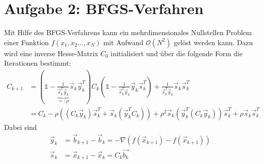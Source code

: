 \section*{Aufgabe 2: BFGS-Verfahren}

Mit Hilfe des BFGS-Verfahrens kann ein mehrdimensionales Nullstellen Problem einer Funktion $f(x_1,x_2...,x_N)$ mit Aufwand $\mathcal{O}(N^2)$ gelöst werden kann.
Dazu wird eine inverse Hesse-Matrix $C_0$ initialisiert und über die folgende Form die Iterationen bestimmt:
\begin{align*}
C_{k+1} &= (\mathds{1} - \underbrace{\frac{1}{\vec{s}_k^T\vec{y}_k}}_{=:\rho}\vec{s}_k\vec{y}_k^T)C_k(\mathds{1}-\frac{1}{\vec{s}_k^T\vec{y}_k}\vec{y}_k\vec{s}_k^T) +\frac{1}{\vec{s}_k^T\vec{y}_k}\vec{s}_k\vec{s}_k^T\\
&= C_k - \rho ((C_k\vec{y}_k)\vec{s}_k^T + \vec{s}_k(\vec{y}_k^TC_k)) + \rho^2\vec{s}_k(\vec{y}_k^T(C_k\vec{y}_k))\vec{s}_k^T +\rho\vec{s}_k\vec{s}_k^T
\end{align*}
Dabei sind
\begin{align*}
\vec{y}_k &= \vec{b}_{k+1} - \vec{b}_k = -\nabla(f(\vec{x}_{k+1})-f(\vec{x}_{k+1}))\\
\vec{s}_k &= \vec{x}_{k+1} - \vec{x}_k = C_k \vec{b_{k}}
\end{align*}
